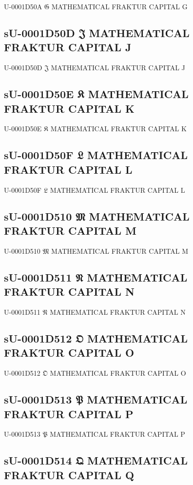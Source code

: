 U-0001D50A 𝔊 MATHEMATICAL FRAKTUR CAPITAL G

\subsection{sU-0001D50D 𝔍 MATHEMATICAL FRAKTUR CAPITAL J}

U-0001D50D 𝔍 MATHEMATICAL FRAKTUR CAPITAL J

\subsection{sU-0001D50E 𝔎 MATHEMATICAL FRAKTUR CAPITAL K}

U-0001D50E 𝔎 MATHEMATICAL FRAKTUR CAPITAL K

\subsection{sU-0001D50F 𝔏 MATHEMATICAL FRAKTUR CAPITAL L}

U-0001D50F 𝔏 MATHEMATICAL FRAKTUR CAPITAL L

\subsection{sU-0001D510 𝔐 MATHEMATICAL FRAKTUR CAPITAL M}

U-0001D510 𝔐 MATHEMATICAL FRAKTUR CAPITAL M

\subsection{sU-0001D511 𝔑 MATHEMATICAL FRAKTUR CAPITAL N}

U-0001D511 𝔑 MATHEMATICAL FRAKTUR CAPITAL N

\subsection{sU-0001D512 𝔒 MATHEMATICAL FRAKTUR CAPITAL O}

U-0001D512 𝔒 MATHEMATICAL FRAKTUR CAPITAL O

\subsection{sU-0001D513 𝔓 MATHEMATICAL FRAKTUR CAPITAL P}

U-0001D513 𝔓 MATHEMATICAL FRAKTUR CAPITAL P

\subsection{sU-0001D514 𝔔 MATHEMATICAL FRAKTUR CAPITAL Q}

